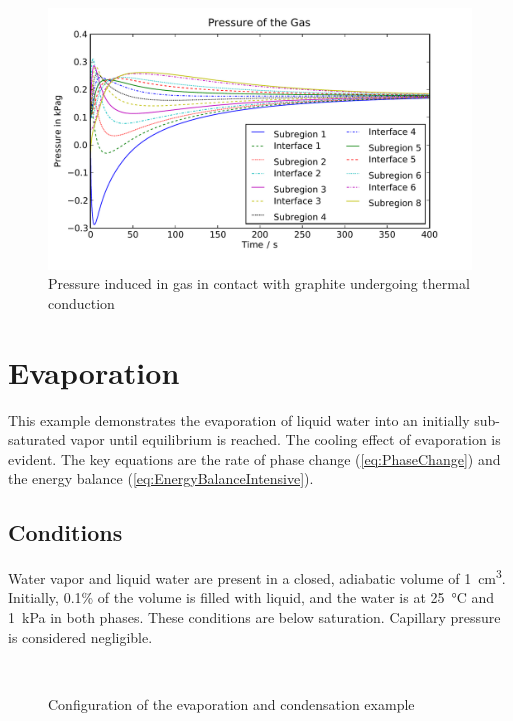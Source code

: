 \begin{figure}[htbp]
  \includegraphics[width=\linewidth]{Results/Basic/ThermalConductionConvection/Pressure}%
  \caption{Pressure induced in gas in contact with graphite undergoing thermal conduction}%
  \label{fig:ThermalConductionConvectionPressure}
\end{figure}


\FloatBarrier %
\section{Evaporation}
\label{sec:Evaporation}

This example demonstrates the evaporation of liquid water into an initially sub-saturated vapor until equilibrium is reached.  The cooling effect of evaporation is evident.  The key equations are the rate of phase change (\autoref{eq:PhaseChange}) and the energy balance (\autoref{eq:EnergyBalanceIntensive}).

\subsection{Conditions}

Water vapor and liquid water are present in a closed, adiabatic volume of \SI{1}{cm^3}.  Initially, 0.1\% of the volume is filled with liquid, and the water is at \SI{25}{\celsius} and \SI{1}{kPa} in both phases.  These conditions are below saturation.  Capillary pressure is considered negligible.

\begin{figure}[htbp]
  \\
  \caption{Configuration of the evaporation and condensation example}
  \label{fig:Evaporation}
\end{figure}

